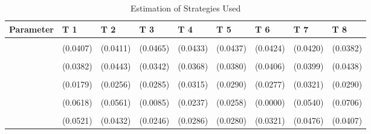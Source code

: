 \begin{table}[!h]
\centering
\caption{Estimation of Strategies Used}
\centering
\begin{tabular}[t]{lllllllll}
\toprule
Parameter & T 1 & T 2 & T 3 & T 4 & T 5 & T 6 & T 7 & T 8\\
\midrule
\cellcolor{gray!10}{gamma} & \cellcolor{gray!10}{0.7653***} & \cellcolor{gray!10}{0.6899***} & \cellcolor{gray!10}{0.7497***} & \cellcolor{gray!10}{0.7811***} & \cellcolor{gray!10}{0.7033***} & \cellcolor{gray!10}{0.7862***} & \cellcolor{gray!10}{0.7223***} & \cellcolor{gray!10}{0.7904***}\\
 & (0.0407) & (0.0411) & (0.0465) & (0.0433) & (0.0437) & (0.0424) & (0.0420) & (0.0382)\\
\cellcolor{gray!10}{AD} & \cellcolor{gray!10}{0.4001***} & \cellcolor{gray!10}{0.3268***} & \cellcolor{gray!10}{0.7901***} & \cellcolor{gray!10}{0.6405***} & \cellcolor{gray!10}{0.7355***} & \cellcolor{gray!10}{0.7420***} & \cellcolor{gray!10}{0.3286***} & \cellcolor{gray!10}{0.3156***}\\
 & (0.0382) & (0.0443) & (0.0342) & (0.0368) & (0.0380) & (0.0406) & (0.0399) & (0.0438)\\
\cellcolor{gray!10}{AC} & \cellcolor{gray!10}{0.0241} & \cellcolor{gray!10}{0.1008***} & \cellcolor{gray!10}{0.1058***} & \cellcolor{gray!10}{0.1366***} & \cellcolor{gray!10}{0.0940**} & \cellcolor{gray!10}{0.0943***} & \cellcolor{gray!10}{0.1757***} & \cellcolor{gray!10}{0.1246***}\\
\addlinespace
 & (0.0179) & (0.0256) & (0.0285) & (0.0315) & (0.0290) & (0.0277) & (0.0321) & (0.0290)\\
\cellcolor{gray!10}{G} & \cellcolor{gray!10}{0.0696} & \cellcolor{gray!10}{0.2423***} & \cellcolor{gray!10}{0.0000} & \cellcolor{gray!10}{0.0433} & \cellcolor{gray!10}{0.0573*} & \cellcolor{gray!10}{0.0000} & \cellcolor{gray!10}{0.1446**} & \cellcolor{gray!10}{0.2156**}\\
 & (0.0618) & (0.0561) & (0.0085) & (0.0237) & (0.0258) & (0.0000) & (0.0540) & (0.0706)\\
\cellcolor{gray!10}{TFT} & \cellcolor{gray!10}{0.2807***} & \cellcolor{gray!10}{0.1345**} & \cellcolor{gray!10}{0.0433} & \cellcolor{gray!10}{0.1049***} & \cellcolor{gray!10}{0.0614*} & \cellcolor{gray!10}{0.0999**} & \cellcolor{gray!10}{0.1921***} & \cellcolor{gray!10}{0.1305**}\\
 & (0.0521) & (0.0432) & (0.0246) & (0.0286) & (0.0280) & (0.0321) & (0.0476) & (0.0407)\\

\end{tabular}
\end{table}
